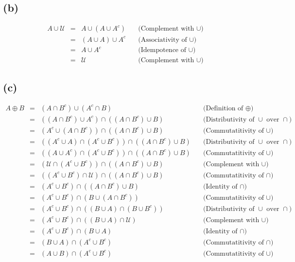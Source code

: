 \documentclass{article} %
\begin{document}
\subsection*{(b)}
\[\begin{array}{rclr}
    A \cup  \mathcal{U} &=& A \cup  (A \cup  A^{c} ) &\quad\mbox{(Complement with $\cup$)}\\
    &=& (A \cup  A) \cup  A^{c}  &\quad\mbox{(Associativity of $\cup$)}\\
    &=& A \cup  A^{c}  &\quad\mbox{(Idempotence of $\cup$)}\\
    &=& \mathcal{U}  &\quad\mbox{(Complement with $\cup$)}
\end{array}\]
\subsection*{(c)}
\[\begin{array}{rclr}
    A \oplus  B&=& (A \cap  B^{c} ) \cup  (A^{c}  \cap  B) &\quad\mbox{(Definition of $\oplus$)}\\
    &=& ((A \cap  B^{c} ) \cup  A^{c} ) \cap  ((A \cap  B^{c} ) \cup  B) &\quad\mbox{(Distributivity of $\cup$ over $\cap$)}\\
    &=& (A^{c}  \cup  (A \cap  B^{c} )) \cap  ((A \cap  B^{c} ) \cup  B) &\quad\mbox{(Commutatitivity of $\cup$)}\\
    &=& ((A^{c}  \cup  A) \cap  (A^{c}  \cup  B^{c} )) \cap  ((A \cap  B^{c} ) \cup  B) &\quad\mbox{(Distributivity of $\cup$ over $\cap$)}\\
    &=& ((A \cup  A^{c} ) \cap  (A^{c}  \cup  B^{c} )) \cap  ((A \cap  B^{c} ) \cup  B) &\quad\mbox{(Commutatitivity of $\cup$)}\\
    &=& (\mathcal{U}  \cap  (A^{c}  \cup  B^{c} )) \cap  ((A \cap  B^{c} ) \cup  B) &\quad\mbox{(Complement with $\cup$)}\\
    &=& ((A^{c}  \cup  B^{c} ) \cap  \mathcal{U} ) \cap  ((A \cap  B^{c} ) \cup  B) &\quad\mbox{(Commutatitivity of $\cap$)}\\
    &=& (A^{c}  \cup  B^{c} ) \cap  ((A \cap  B^{c} ) \cup  B) &\quad\mbox{(Identity of $\cap$)}\\
    &=& (A^{c}  \cup  B^{c} ) \cap  (B \cup  (A \cap  B^{c} )) &\quad\mbox{(Commutatitivity of $\cup$)}\\
    &=& (A^{c}  \cup  B^{c} ) \cap  ((B \cup  A) \cap  (B \cup  B^{c} )) &\quad\mbox{(Distributivity of $\cup$ over $\cap$)}\\
    &=& (A^{c}  \cup  B^{c} ) \cap  ((B \cup  A) \cap  \mathcal{U} ) &\quad\mbox{(Complement with $\cup$)}\\
    &=& (A^{c}  \cup  B^{c} ) \cap  (B \cup  A) &\quad\mbox{(Identity of $\cap$)}\\
    &=& (B \cup  A) \cap  (A^{c}  \cup  B^{c} ) &\quad\mbox{(Commutatitivity of $\cap$)}\\
    &=& (A \cup  B) \cap  (A^{c}  \cup  B^{c} ) &\quad\mbox{(Commutatitivity of $\cup$)}
\end{array}\]
\end{document}
